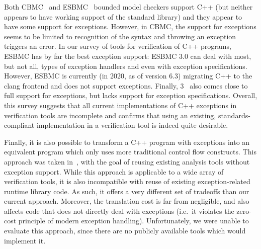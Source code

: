 Both CBMC~ and
ESBMC~ bounded model checkers support C++
(but neither appears to have working support of the standard library) and they
appear to have some support for exceptions.
However, in CBMC, the support for exceptions seems to be limited to recognition
of the  syntax and throwing an exception triggers an error.%
In our survey of tools for verification of C++ programs, ESBMC
has by far the best exception support: ESBMC 3.0 can deal with most, but not
all, types of exception handlers and even with exception
specifications.
However, ESBMC is currently (in 2020, as of version 6.3) migrating C++ to the clang frontend and does not support exceptions.
Finally, \divine{} 3~ also comes close to
full support for exceptions, but lacks support for exception
specifications. Overall, this survey suggests that all current
implementations of C++ exceptions in verification tools are incomplete
and confirms that using an existing, standards-compliant implementation
in a verification tool is indeed quite desirable.

Finally, it is also possible to transform a C++ program with exceptions
into an equivalent program which only uses more traditional control flow
constructs. This approach was taken in~,
with the goal of reusing existing analysis tools without exception
support. While this approach is applicable to a wide array of
verification tools, it is also incompatible with reuse of existing
exception-related runtime library code. As such, it offers a very
different set of tradeoffs than our current approach. Moreover, the
translation cost is far from negligible, and also affects code that does
not directly deal with exceptions (i.e.~it violates the zero-cost
principle of modern exception handling). Unfortunately, we were unable
to evaluate this approach, since there are no publicly available tools
which would implement it.

